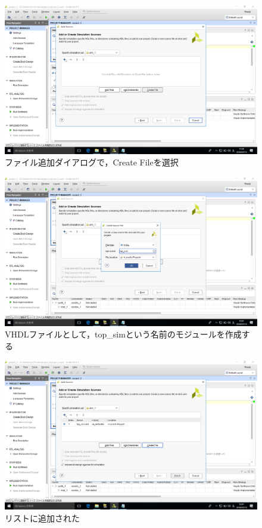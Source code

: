 \documentclass[a4paper,dvipdfmx]{jsarticle}
\begin{document}
 \begin{figure}[H]
  \begin{center}
   \includegraphics[width=.8\textwidth]{chapter04_figures/VirtualBox_Windows10_19_03_2018_12_00_00.png}
  \end{center}
  \caption{ファイル追加ダイアログで，Create Fileを選択}
 \end{figure}

 \begin{figure}[H]
  \begin{center}
   \includegraphics[width=.8\textwidth]{chapter04_figures/VirtualBox_Windows10_19_03_2018_12_01_34.png}
  \end{center}
  \caption{VHDLファイルとして，top\_simという名前のモジュールを作成する}
 \end{figure}

 \begin{figure}[H]
  \begin{center}
   \includegraphics[width=.8\textwidth]{chapter04_figures/VirtualBox_Windows10_19_03_2018_12_01_42.png}
  \end{center}
  \caption{リストに追加された}
 \end{figure}
\end{document}
